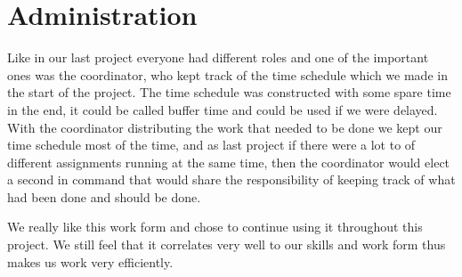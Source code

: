 \section{Administration}
Like in our last project everyone had different roles and one of the important ones was the coordinator, who kept track of the time schedule which we made in the start of the project. The time schedule was constructed with some spare time in the end, it could be called buffer time and could be used if we were delayed. With the coordinator distributing the work that needed to be done we kept our time schedule most of the time, and as last project if there were a lot to of different assignments running at the same time, then the coordinator would elect a second in command that would share the responsibility of keeping track of what had been done and should be done.

We really like this work form and chose to continue using it throughout this project. We still feel that it correlates very well to our skills and work form thus makes us work very efficiently.